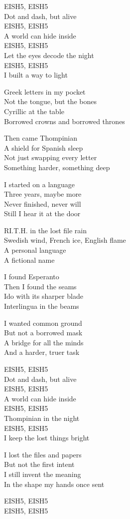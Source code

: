 \begin{lyrics}
EISH5, EISH5\\
Dot and dash, but alive\\
EISH5, EISH5\\
A world can hide inside\\
EISH5, EISH5\\
Let the eyes decode the night\\
EISH5, EISH5\\
I built a way to light

Greek letters in my pocket\\
Not the tongue, but the bones\\
Cyrillic at the table\\
Borrowed crowns and borrowed thrones

Then came Thompinian\\
A shield for Spanish sleep\\
Not just swapping every letter\\
Something harder, something deep

I started on a language\\
Three years, maybe more\\
Never finished, never will\\
Still I hear it at the door

RI.T.H. in the lost file rain\\
Swedish wind, French ice, English flame\\
A personal language\\
A fictional name

I found Esperanto\\
Then I found the seams\\
Ido with its sharper blade\\
Interlingua in the beams

I wanted common ground\\
But not a borrowed mask\\
A bridge for all the minds\\
And a harder, truer task

EISH5, EISH5\\
Dot and dash, but alive\\
EISH5, EISH5\\
A world can hide inside\\
EISH5, EISH5\\
Thompinian in the night\\
EISH5, EISH5\\
I keep the lost things bright

I lost the files and papers\\
But not the first intent\\
I still invent the meaning\\
In the shape my hands once sent

EISH5, EISH5\\
EISH5, EISH5
\end{lyrics}

